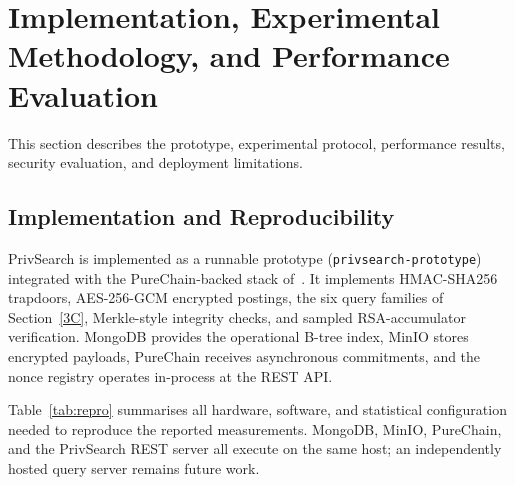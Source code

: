 \documentclass[journal]{IEEEtran}
\theoremstyle{tight}
\theoremstyle{remark}
\theoremstyle{plain}
\begin{document}
 
\section{Implementation, Experimental Methodology, and Performance Evaluation}
\label{4}

This section describes the prototype, experimental protocol, performance results, security evaluation, and deployment limitations.

\subsection{Implementation and Reproducibility}
\label{4A}

PrivSearch is implemented as a runnable prototype (\texttt{privsearch-prototype}) integrated with the PureChain-backed stack of~\cite{Nnadiekwe2026PureSearchHCC}. It implements HMAC-SHA256 trapdoors, AES-256-GCM encrypted postings, the six query families of Section~\ref{3C}, Merkle-style integrity checks, and sampled RSA-accumulator verification. MongoDB provides the operational B-tree index, MinIO stores encrypted payloads, PureChain receives asynchronous commitments, and the nonce registry operates in-process at the REST API.

Table~\ref{tab:repro} summarises all hardware, software, and statistical configuration needed to reproduce the reported measurements. MongoDB, MinIO, PureChain, and the PrivSearch REST server all execute on the same host; an independently hosted query server remains future work.
\end{document}
